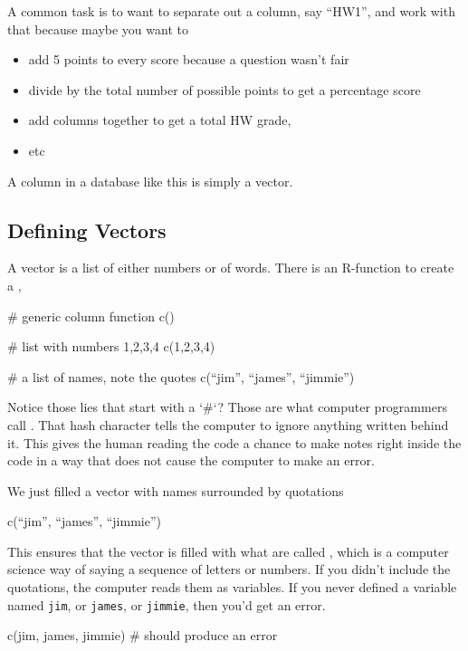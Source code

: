 A common task is to want to separate out a column, say ``HW1'', and
work with that because maybe you want to
\begin{itemize}
\item add 5 points to every score because a question wasn't fair
\item divide by the total number of possible points to get a percentage score
\item add columns together to get a total HW grade,
\item etc
\end{itemize}

A column in a database like this is simply a vector.
  
\subsection{Defining Vectors}

A vector is a list of either numbers or of words. There is an
R-function to create a ,

\begin{rcode}
# generic column function
c()

# list with numbers 1,2,3,4
c(1,2,3,4)

# a list of names, note the quotes
c(``jim'', ``james'', ``jimmie'') 
\end{rcode}

Notice those lies that start with a `\#`?  Those are what computer programmers call .  That hash character tells the computer to ignore anything written behind it. This gives the human reading the code a chance to make notes right inside the code in a way that does not cause the computer to make an error.

We just filled a vector with names surrounded by quotations

\begin{rcode}
  c(``jim'', ``james'', ``jimmie'')
\end{rcode}

This ensures that the vector is filled with what are called
, which is a computer science way of saying a sequence
of letters or numbers. If you didn't include the quotations, the
computer reads them as variables. If you never defined a variable
named \texttt{jim}, or \texttt{james}, or \texttt{jimmie}, then you'd
get an error.

\begin{rcode}
  c(jim, james, jimmie) # should produce an error
\end{rcode}

